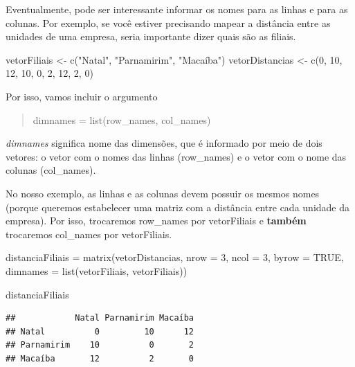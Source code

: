 \documentclass[
]{book}
\newenvironment{Shaded}{\begin{snugshade}}{\end{snugshade}}
\newcommand{\AttributeTok}[1]{\textcolor[rgb]{0.77,0.63,0.00}{#1}}
\newcommand{\ConstantTok}[1]{\textcolor[rgb]{0.00,0.00,0.00}{#1}}
\newcommand{\DecValTok}[1]{\textcolor[rgb]{0.00,0.00,0.81}{#1}}
\newcommand{\FunctionTok}[1]{\textcolor[rgb]{0.00,0.00,0.00}{#1}}
\newcommand{\NormalTok}[1]{#1}
\newcommand{\OtherTok}[1]{\textcolor[rgb]{0.56,0.35,0.01}{#1}}
\newcommand{\StringTok}[1]{\textcolor[rgb]{0.31,0.60,0.02}{#1}}
\begin{document}
Eventualmente, pode ser interessante informar os nomes para as linhas e para as colunas. Por exemplo, se você estiver precisando mapear a distância entre as unidades de uma empresa, seria importante dizer quais são as filiais.

\begin{Shaded}
\begin{Highlighting}[]
\NormalTok{vetorFiliais }\OtherTok{\textless{}{-}} \FunctionTok{c}\NormalTok{(}\StringTok{"Natal"}\NormalTok{, }\StringTok{"Parnamirim"}\NormalTok{, }\StringTok{"Macaíba"}\NormalTok{)}
\NormalTok{vetorDistancias }\OtherTok{\textless{}{-}} \FunctionTok{c}\NormalTok{(}\DecValTok{0}\NormalTok{, }\DecValTok{10}\NormalTok{, }\DecValTok{12}\NormalTok{, }\DecValTok{10}\NormalTok{, }\DecValTok{0}\NormalTok{, }\DecValTok{2}\NormalTok{, }\DecValTok{12}\NormalTok{, }\DecValTok{2}\NormalTok{, }\DecValTok{0}\NormalTok{)}
\end{Highlighting}
\end{Shaded}

Por isso, vamos incluir o argumento

\begin{quote}
dimnames = list(row\_names, col\_names)
\end{quote}

\emph{dimnames} significa nome das dimensões, que é informado por meio de dois vetores: o vetor com o nomes das linhas (row\_names) e o vetor com o nome das colunas (col\_names).

No nosso exemplo, as linhas e as colunas devem possuir os mesmos nomes (porque queremos estabelecer uma matriz com a distância entre cada unidade da empresa). Por isso, trocaremos row\_names por vetorFiliais e \textbf{também} trocaremos col\_names por vetorFiliais.

\begin{Shaded}
\begin{Highlighting}[]
\NormalTok{distanciaFiliais }\OtherTok{=} \FunctionTok{matrix}\NormalTok{(vetorDistancias, }\AttributeTok{nrow =} \DecValTok{3}\NormalTok{, }\AttributeTok{ncol =} \DecValTok{3}\NormalTok{, }\AttributeTok{byrow =} \ConstantTok{TRUE}\NormalTok{,}
             \AttributeTok{dimnames =} \FunctionTok{list}\NormalTok{(vetorFiliais, vetorFiliais))}

\NormalTok{distanciaFiliais}
\end{Highlighting}
\end{Shaded}

\begin{verbatim}
##            Natal Parnamirim Macaíba
## Natal          0         10      12
## Parnamirim    10          0       2
## Macaíba       12          2       0
\end{verbatim}
\end{document}
